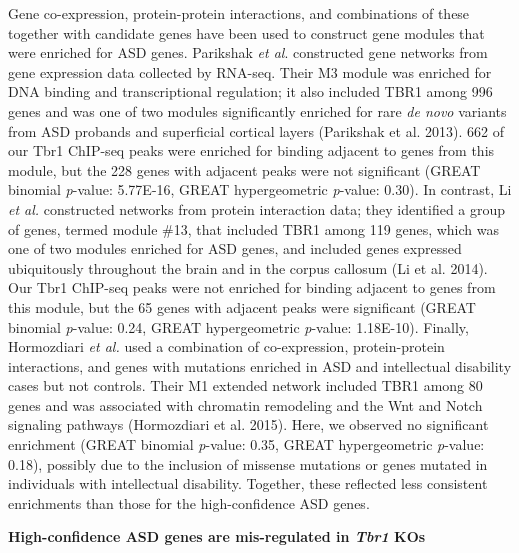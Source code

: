 \documentclass[]{article}
\begin{document}
Gene co-expression, protein-protein interactions, and combinations of
these together with candidate genes have been used to construct gene
modules that were enriched for ASD genes. Parikshak \emph{et al}.
constructed gene networks from gene expression data collected by
RNA-seq. Their M3 module was enriched for DNA binding and
transcriptional regulation; it also included TBR1 among 996 genes and
was one of two modules significantly enriched for rare \emph{de novo}
variants from ASD probands and superficial cortical layers (Parikshak et
al. 2013). 662 of our Tbr1 ChIP-seq peaks were enriched for binding
adjacent to genes from this module, but the 228 genes with adjacent
peaks were not significant (GREAT binomial \emph{p}-value: 5.77E-16,
GREAT hypergeometric \emph{p}-value: 0.30). In contrast, Li \emph{et
al.} constructed networks from protein interaction data; they identified
a group of genes, termed module \#13, that included TBR1 among 119
genes, which was one of two modules enriched for ASD genes, and included
genes expressed ubiquitously throughout the brain and in the corpus
callosum (Li et al. 2014). Our Tbr1 ChIP-seq peaks were not enriched for
binding adjacent to genes from this module, but the 65 genes with
adjacent peaks were significant (GREAT binomial \emph{p}-value: 0.24,
GREAT hypergeometric \emph{p}-value: 1.18E-10). Finally, Hormozdiari
\emph{et al.} used a combination of co-expression, protein-protein
interactions, and genes with mutations enriched in ASD and intellectual
disability cases but not controls. Their M1 extended network included
TBR1 among 80 genes and was associated with chromatin remodeling and the
Wnt and Notch signaling pathways (Hormozdiari et al. 2015). Here, we
observed no significant enrichment (GREAT binomial \emph{p}-value: 0.35,
GREAT hypergeometric \emph{p}-value: 0.18), possibly due to the
inclusion of missense mutations or genes mutated in individuals with
intellectual disability. Together, these reflected less consistent
enrichments than those for the high-confidence ASD genes.

\textbf{High-confidence ASD genes are mis-regulated in \emph{Tbr1} KOs }
\end{document}
